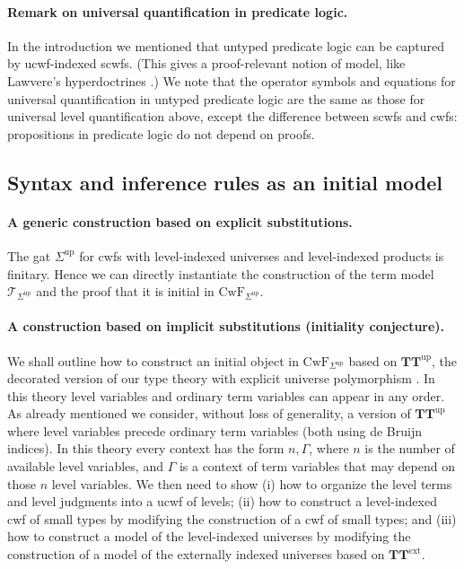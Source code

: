 \documentclass[11pt,a4paper]{article}
\theoremstyle{plain}
\theoremstyle{definition}
\newcommand{\T}{\mathsf{T}}
\def\T{\mathcal{T}}
\def\CwF{\mathrm{CwF}}
\def\Sigmaint{{\Sigma^\mathrm{up}}}
\def\TText{{\mathbf{TT}^\mathrm{ext}}}
\def\TTint{{\mathbf{TT}^\mathrm{up}}}
\begin{document}
\paragraph{Remark on universal quantification in predicate logic.}

In the introduction we mentioned that untyped predicate logic can be captured by ucwf-indexed scwfs. (This gives a proof-relevant notion of model, like Lawvere's hyperdoctrines \cite{lawvere:hyperdoctrines}.) We note that the operator symbols and equations for universal quantification in untyped predicate logic are the same as those for universal level quantification above, except the difference between scwfs and cwfs: propositions in predicate logic do not depend on proofs.

\subsection{Syntax and inference rules as an initial model}\label{initiality-internal}

\paragraph{A generic construction based on explicit substitutions.} The gat $\Sigmaint$ for cwfs with level-indexed universes and level-indexed products is finitary. Hence we can directly instantiate the construction of the term model $\T_{\Sigmaint}$ \cite{bezem:hofmann} and the proof that it is initial in $\CwF_{\Sigmaint}$.

\paragraph{A construction based on implicit substitutions (initiality conjecture).} We shall outline how to construct an initial object in $\CwF_{\Sigmaint}$ based on $\TTint$, the decorated version of our type theory with explicit universe polymorphism \cite{BezemCDE22}. In this theory level variables and ordinary term variables can appear in any order. As already mentioned we consider, without loss of generality, a version of $\TTint$ where level variables precede ordinary term variables (both using de Bruijn indices). In this theory every context has the form $n,\Gamma$, where $n$ is the number of available level variables, and $\Gamma$ is a context of term variables that may depend on those $n$ level variables. We then need to show (i) how to organize the level terms and level judgments into a ucwf of levels; (ii) how to construct a level-indexed cwf of small types by modifying the construction of a cwf of small types; and (iii) how to construct a model of the level-indexed universes by modifying the construction of a model of the externally indexed universes based on $\TText$.
\end{document}
